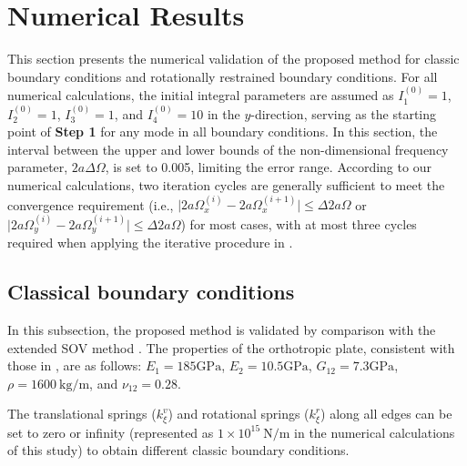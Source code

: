 \documentclass[preprint,12pt]{elsarticle}
\newcommand{\urho}{~\unit{\kilogram\per\meter}\xspace}
\newcommand{\ustif}{~\unit{\newton\per\metre}\xspace}
\newcommand{\nugpa}{\si{\giga\pascal}\xspace}
\begin{document}
\FloatBarrier
\section{Numerical Results}  
This section presents the numerical validation of the proposed method for classic boundary conditions and rotationally restrained boundary conditions.  
For all numerical calculations, the initial integral parameters are assumed as \(I^{(0)}_1=1\), \(I^{(0)}_2=1\), \(I^{(0)}_3=1\), and \(I^{(0)}_4=10\) in the \(y\)-direction, serving as the starting point of \textbf{Step 1} for any mode in all boundary conditions.  
In this section, the interval between the upper and lower bounds of the non-dimensional frequency parameter, \(2a\Delta\Omega\), is set to 0.005, limiting the error range.  
According to our numerical calculations, two iteration cycles are generally sufficient to meet the convergence requirement (i.e., \(\lvert 2a\Omega^{(i)}_{x} - 2a\Omega^{(i+1)}_{x} \rvert \leq \Delta 2a\Omega\) or \(\lvert 2a\Omega^{(i)}_{y} - 2a\Omega^{(i+1)}_{y} \rvert \leq \Delta 2a\Omega\)) for most cases, with at most three cycles required when applying the iterative procedure in .
 
 

\subsection{Classical boundary conditions}
In this subsection, the proposed method is validated by comparison with the extended SOV method \cite{xing2020extended}.  
The properties of the orthotropic plate, consistent with those in \cite{xing2020extended}, are as follows:  
\(E_1 = 185 \nugpa\), \(E_2 = 10.5 \nugpa\), \(G_{12} = 7.3 \nugpa\), \(\rho = 1600 \urho\), and \(\nu_{12} = 0.28\).
  
The translational springs (\(k^v_\xi\)) and rotational springs (\(k^r_\xi\)) along all edges can be set to zero or infinity (represented as \(1 \times 10^{15} \ustif\) in the numerical calculations of this study) to obtain different classic boundary conditions.  
\end{document}
